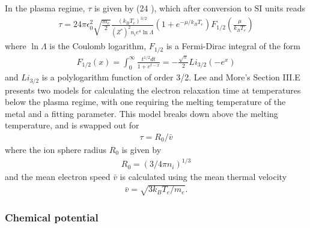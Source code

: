 \documentclass[12pt]{article}
\numberwithin{equation}{section}
\begin{document}
In the plasma regime, $\tau$ is given by (24 \cite{eta:LeeMore}), which after conversion to SI units reads
%
\begin{align} \label{eq:tau_plas}
  \tau = 24\pi\epsilon_0^2\sqrt{\frac{m_e}{2}}\frac{(k_BT_e)^{3/2}}{\left(Z^*\right)^2n_ie^4 \ln\Lambda} 
         \left(1+e^{-\mu/k_B T_e}\right)F_{1/2}\left(\frac{\mu}{k_BT_e}\right)
\end{align}
%
where $\ln\Lambda$ is the Coulomb logarithm, $F_{1/2}$ is a Fermi-Dirac integral of the form
%
\begin{align} \label{eq:FermiIntegral}
  F_{1/2}(x) = \int_0^\infty \frac{t^{1/2}dt}{1+e^{t-x}} = -\frac{\sqrt{\pi}}{2}Li_{3/2}(-e^x)
\end{align}
%
and $Li_{3/2}$ is a polylogarithm function of order 3/2. Lee and More's Section III.E \cite{eta:LeeMore} presents two models for calculating the electron relaxation time at temperatures below the plasma regime, with one requiring the melting temperature of the metal and a fitting parameter. This model breaks down above the melting temperature, and is swapped out for 
%
\begin{align} \label{eq:tau_cold}
  \tau = R_0/\bar{v}
\end{align}
%
where the ion sphere radius $R_0$ is given by
% 
\begin{align} \label{eq:IonSphereRad}
  R_0 = (3/4\pi n_i)^{1/3}
\end{align}
%
and the mean electron speed $\bar{v}$ is calculated using the mean thermal velocity 
%
\begin{align} \label{eq:thermal_speed}
  \bar{v} = \sqrt{3k_BT_e/m_e}.
\end{align}

\subsubsection{Chemical potential}
\end{document}
